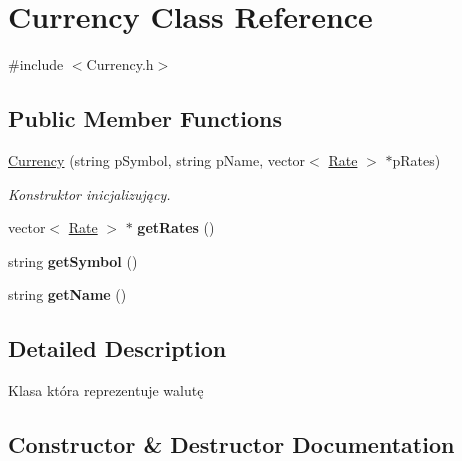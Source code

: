 \hypertarget{classCurrency}{}\section{Currency Class Reference}
\label{classCurrency}


{\ttfamily \#include $<$Currency.\+h$>$}

\subsection*{Public Member Functions}
\begin{DoxyCompactItemize}
\item 
\hyperlink{classCurrency_a7f2224f727fe47ca08d974e22a7c8fa7}{Currency} (string p\+Symbol, string p\+Name, vector$<$ \hyperlink{structRate}{Rate} $>$ $\ast$p\+Rates)
\begin{DoxyCompactList}\small\item\em Konstruktor inicjalizujący. \end{DoxyCompactList}\item 
vector$<$ \hyperlink{structRate}{Rate} $>$ $\ast$ {\bfseries get\+Rates} ()\hypertarget{classCurrency_ad455c54be892e027506b84215ae33e09}{}\label{classCurrency_ad455c54be892e027506b84215ae33e09}

\item 
string {\bfseries get\+Symbol} ()\hypertarget{classCurrency_ac765f334ac6016f94439b0803ac16c32}{}\label{classCurrency_ac765f334ac6016f94439b0803ac16c32}

\item 
string {\bfseries get\+Name} ()\hypertarget{classCurrency_abc3da8b9245a604d0898691a628f77d7}{}\label{classCurrency_abc3da8b9245a604d0898691a628f77d7}

\end{DoxyCompactItemize}


\subsection{Detailed Description}
Klasa która reprezentuje walutę 

\subsection{Constructor \& Destructor Documentation}
